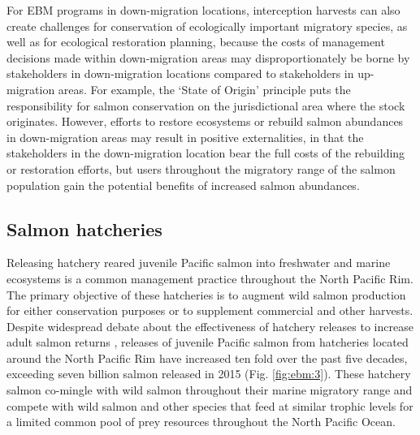 For EBM programs in down-migration locations, interception harvests can
also create challenges for conservation of ecologically important
migratory species, as well as for ecological restoration planning,
because the costs of management decisions made within down-migration
areas may disproportionately be borne by stakeholders in down-migration
locations compared to stakeholders in up-migration areas. For example,
the `State of Origin' principle puts the responsibility for salmon
conservation on the jurisdictional area where the stock originates.
However, efforts to restore ecosystems or rebuild salmon abundances in
down-migration areas may result in positive externalities, in that the
stakeholders in the down-migration location bear the full costs of the
rebuilding or restoration efforts, but users throughout the migratory
range of the salmon population gain the potential benefits of increased
salmon abundances.

\subsection{Salmon hatcheries}

Releasing hatchery reared juvenile Pacific salmon into freshwater and
marine ecosystems is a common management practice throughout the North
Pacific Rim. The primary objective of these hatcheries is to augment
wild salmon production for either conservation purposes or to supplement
commercial and other harvests. Despite widespread debate about the
effectiveness of hatchery releases to increase adult salmon returns
\citep{Hilborn2000a, Wertheimer2001a, Hilborn2001a}, releases of
juvenile Pacific salmon from hatcheries located around the North Pacific
Rim have increased ten fold over the past five decades, exceeding seven
billion salmon released in 2015 (Fig. \ref{fig:ebm:3}). These hatchery salmon
co-mingle with wild salmon throughout their marine migratory range and compete
with wild salmon and other species that feed at similar trophic levels for a
limited common pool of prey resources throughout the North Pacific Ocean.

